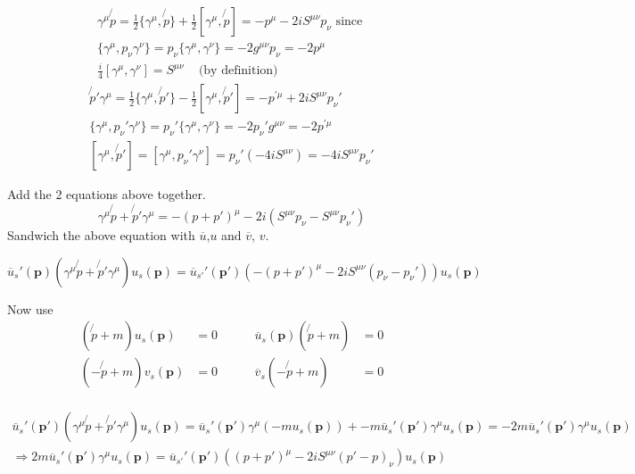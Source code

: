 \documentclass[twoside]{amsart}
\newcommand{\solutionhead}[1]
  {\smallskip
   \noindent{\large\bf Solution #1.}
   }
\begin{document}
\solutionhead{38.3} 
\[
\begin{gathered}
  \gamma^{\mu}\not{p} = \frac{1}{2} \lbrace \gamma^{\mu}, \not{p} \rbrace + \frac{1}{2} \left[ \gamma^{\mu}, \not{p} \right] = - p^{\mu} - 2i S^{\mu \nu} p_{\nu} \text{ since } \\
  \lbrace \gamma^{\mu}, p_{\nu} \gamma^{\nu} \rbrace = p_{\nu} \lbrace \gamma^{\mu}, \gamma^{\nu} \rbrace =  -2 g^{\mu \nu} p_{\nu} = - 2p^{\mu} \\
\frac{i}{4} [ \gamma^{\mu}, \gamma^{\nu} ] = S^{\mu \nu} \quad \, \text{(by definition)}
\end{gathered}
\]
\[
\begin{gathered}
  \not{p}'\gamma^{\mu} = \frac{1}{2} \lbrace \gamma^{\mu}, \not{p}' \rbrace - \frac{1}{2} [ \gamma^{\mu}, \not{p}' ] = - p^{'\mu} + 2i S^{\mu \nu} p_{\nu}' \\
  \lbrace \gamma^{\mu}, p_{\nu}'\gamma^{\nu} \rbrace = p_{\nu}' \lbrace \gamma^{\mu}, \gamma^{\nu} \rbrace = -2p_{\nu}' g^{\mu \nu} = -2 p^{'\mu} \\
[\gamma^{\mu}, \not{p}' ] = [\gamma^{\mu}, p_{\nu}' \gamma^{\nu} ] = p_{\nu}' (-4i S^{\mu \nu}) = -4i S^{\mu \nu} p_{\nu}'
\end{gathered}
\]

Add the 2 equations above together.  
\[
\gamma^{\mu} \not{p} + \not{p}' \gamma^{\mu} = - (p + p')^{\mu} - 2i (S^{\mu \nu} p_{\nu} - S^{\mu \nu} p_{\nu}' ) 
\]
Sandwich the above equation with $\overline{u}$,$u$ and $\overline{v}$, $v$.

\[
\overline{u}_s'( \mathbf{p})(\gamma^{\mu} \not{p} + \not{p}' \gamma^{\mu})u_s(\mathbf{p}) = \overline{u}_{s'}'(\mathbf{p}') ( - (p + p')^{\mu} - 2i S^{\mu \nu} (p_{\nu} - p_{\nu}') )u_s(\mathbf{p})
\]

Now use 
\[
\begin{aligned}
  (\not{p} + m)u_s(\mathbf{p}) & = 0 \\ 
  (-\not{p} + m)v_s(\mathbf{p}) & = 0 \\ 
\end{aligned}
\quad \quad \, \begin{aligned}
  \overline{u}_s(\mathbf{p})(\not{p} + m) & = 0 \\ 
  \overline{v}_s(-\not{p} + m) & = 0 \\ 
\end{aligned} 
\]

\[
\begin{gathered}
  \overline{u}_s'(\mathbf{p}')(\gamma^{\mu}\not{p} + \not{p}' \gamma^{\mu})u_s(\mathbf{p}) = \overline{u}_s'(\mathbf{p}') \gamma^{\mu}(-m u_s(\mathbf{p})) + - m \overline{u}_s'(\mathbf{p}') \gamma^{\mu} u_s(\mathbf{p}) = -2m \overline{u}_s'(\mathbf{p}') \gamma^{\mu} u_s(\mathbf{p}) \\ 
  \Longrightarrow \boxed{ 2m \overline{u}_s'(\mathbf{p}') \gamma^{\mu} u_s(\mathbf{p}) = \overline{u}_{s'}'(\mathbf{p}') ((p + p')^{\mu} - 2i S^{\mu \nu}( p' -p)_{\nu}) u_s(\mathbf{p}) }
\end{gathered}
\]
\end{document}
